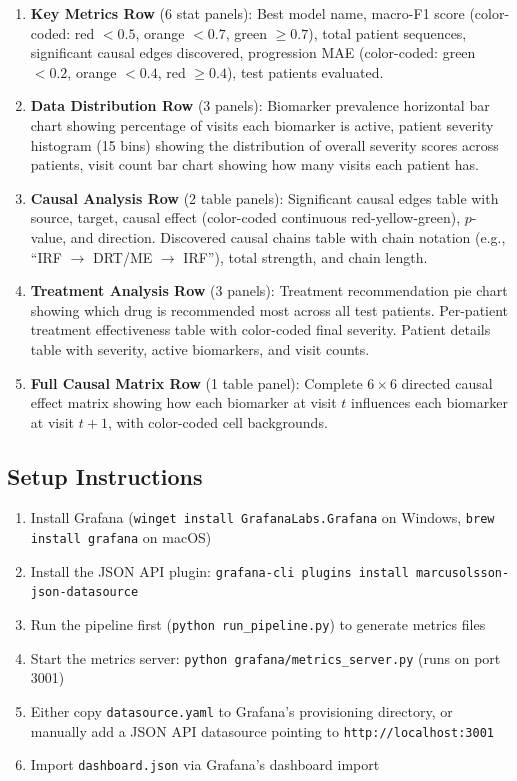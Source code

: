 \documentclass[12pt,a4paper]{article}
\begin{document}
\begin{enumerate}[nosep]
  \item \textbf{Key Metrics Row} (6 stat panels): Best model name, macro-F1 score (color-coded: red $< 0.5$, orange $< 0.7$, green $\geq 0.7$), total patient sequences, significant causal edges discovered, progression MAE (color-coded: green $< 0.2$, orange $< 0.4$, red $\geq 0.4$), test patients evaluated.

  \item \textbf{Data Distribution Row} (3 panels): Biomarker prevalence horizontal bar chart showing percentage of visits each biomarker is active, patient severity histogram (15 bins) showing the distribution of overall severity scores across patients, visit count bar chart showing how many visits each patient has.

  \item \textbf{Causal Analysis Row} (2 table panels): Significant causal edges table with source, target, causal effect (color-coded continuous red-yellow-green), $p$-value, and direction. Discovered causal chains table with chain notation (e.g., ``IRF $\to$ DRT/ME $\to$ IRF''), total strength, and chain length.

  \item \textbf{Treatment Analysis Row} (3 panels): Treatment recommendation pie chart showing which drug is recommended most across all test patients. Per-patient treatment effectiveness table with color-coded final severity. Patient details table with severity, active biomarkers, and visit counts.

  \item \textbf{Full Causal Matrix Row} (1 table panel): Complete $6 \times 6$ directed causal effect matrix showing how each biomarker at visit $t$ influences each biomarker at visit $t{+}1$, with color-coded cell backgrounds.
\end{enumerate}

\subsection{Setup Instructions}

\begin{enumerate}[nosep]
  \item Install Grafana (\texttt{winget install GrafanaLabs.Grafana} on Windows, \texttt{brew install grafana} on macOS)
  \item Install the JSON API plugin: \texttt{grafana-cli plugins install marcusolsson-json-datasource}
  \item Run the pipeline first (\texttt{python run\_pipeline.py}) to generate metrics files
  \item Start the metrics server: \texttt{python grafana/metrics\_server.py} (runs on port 3001)
  \item Either copy \texttt{datasource.yaml} to Grafana's provisioning directory, or manually add a JSON API datasource pointing to \texttt{http://localhost:3001}
  \item Import \texttt{dashboard.json} via Grafana's dashboard import
\end{enumerate}
\end{document}
